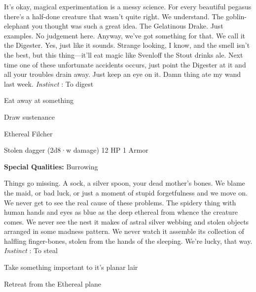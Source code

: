 \startMonsterDescription
It’s okay, magical experimentation is a messy science. For every beautiful pegasus there’s a half-done creature that wasn’t quite right. We understand. The goblin-elephant you thought was such a great idea. The Gelatinous Drake. Just examples. No judgement here. Anyway, we’ve got something for that. We call it the Digester. Yes, just like it sounds. Strange looking, I know, and the smell isn’t the best, but this thing—it’ll eat magic like Svenloff the Stout drinks ale. Next time one of these unfortunate accidents occurs, just point the Digester at it and all your troubles drain away. Just keep an eye on it. Damn thing ate my wand last week. {\em Instinct} : To digest
\stopMonsterDescription
       
\startitemize[1,packed]
         
\item Eat away at something

         
\item Draw sustenance

       
\stopitemize
       
\startMonsterName
Ethereal Filcher	 
\stopMonsterName
       

Stolen dagger (2d8·w damage)	12 HP	1 Armor

       


       
\startMonsterQualities
         {\bf Special Qualities:}  Burrowing
\stopMonsterQualities
       
\startMonsterDescription
Things go missing. A sock, a silver spoon, your dead mother’s bones. We blame the maid, or bad luck, or just a moment of stupid forgetfulness and we move on. We never get to see the real cause of these problems. The spidery thing with human hands and eyes as blue as the deep ethereal from whence the creature comes. We never see the nest it makes of astral silver webbing and stolen objects arranged in some madness pattern. We never watch it assemble its collection of halfling finger-bones, stolen from the hands of the sleeping. We’re lucky, that way. {\em Instinct} : To steal
\stopMonsterDescription
       
\startitemize[1,packed]
         
\item Take something important to it's planar lair

         
\item Retreat from the Ethereal plane

